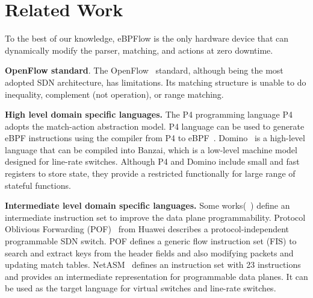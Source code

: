 \section{Related Work}
\label{sec:relatedWork}

%

To the best of our knowledge, eBPFlow is the only hardware device that can dynamically modify the parser, matching, and actions at zero downtime.

\textbf{OpenFlow standard}. The OpenFlow~\cite{McKeown:2008:OpenFlow} standard, although being the most adopted SDN architecture, has limitations. Its matching structure is unable to do inequality, complement (not operation), or range matching. 


\textbf{High level domain specific languages.} The P4 programming language P4~\cite{Bosshart:2014:P4} adopts the match-action abstraction model. 
P4 language can be used to generate eBPF instructions using the compiler from P4 to eBPF~\cite{P42EBPF2015}. Domino~\cite{Sivaraman:2016:PTH:2934872.2934900} is a high-level language that can be compiled into Banzai, which is a low-level machine model designed for line-rate switches. 
Although P4 and Domino include small and fast registers to store state, they provide a restricted functionally for large range of stateful functions.

\textbf{Intermediate level domain specific languages.} Some works(~\cite{Song:2013:POF:2491185.2491190,Shahbaz:2015:NetASM,Sivaraman:2016:PTH:2934872.2934900}) define an intermediate instruction set to improve the data plane programmability.
Protocol Oblivious Forwarding (POF)~\cite{Song:2013:POF:2491185.2491190} from Huawei describes a protocol-independent programmable SDN switch. POF defines a generic flow instruction set (FIS) to search and extract keys from the header fields and also modifying packets and updating match tables. NetASM~\cite{Shahbaz:2015:NetASM} defines an instruction set with 23 instructions and provides an intermediate representation for programmable data planes. It can be used as the target language for virtual switches and line-rate switches. 

